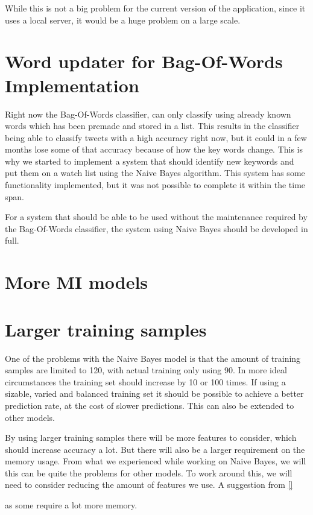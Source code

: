While this is not a big problem for the current version of the application,
since it uses a local server, it would be a huge problem on a large scale. 

\section*{Word updater for Bag-Of-Words Implementation}
Right now the Bag-Of-Words classifier, can only classify using already known
words which has been premade and stored in a list. This results in the
classifier being able to classify tweets with a high accuracy right now, but it
could in a few months lose some of that accuracy because of how the key words 
change. This is why we started to implement a system that should identify new
keywords and put them on a watch list using the Naive Bayes algorithm. This
system has some functionality implemented, but it was not possible to complete it within the time span.

For a system that should be able to be used without the maintenance required by
the Bag-Of-Words classifier, the system using Naive Bayes should be developed in
full.

\section*{More MI models}

\section*{Larger training samples}
One of the problems with the Naive Bayes model is that the amount of training
samples are limited to 120, with actual training only using 90. In more ideal
circumstances the training set should increase by 10 or 100 times. If using a
sizable, varied and balanced training set it should be possible to achieve a
better prediction rate, at the cost of slower predictions. This can also be
extended to other models.\nl

By using larger training samples there will be more features to consider, which
should increase accuracy a lot. But there will also be a larger requirement on
the memory usage. From what we experienced while working on Naive
Bayes, we will this can be quite the problems for other models. To work around
this, we will need to consider reducing the amount of features we use. A
suggestion from \autoref{}

 as some
require a lot more memory. 






